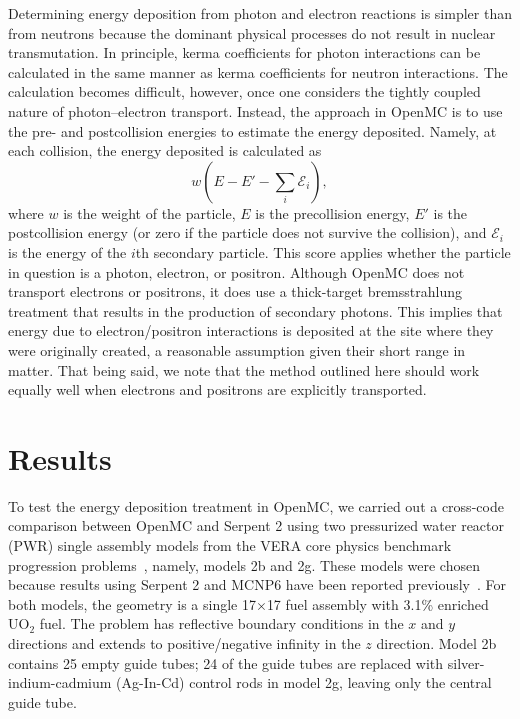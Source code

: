 \documentclass{anstrans}
\begin{document}
Determining energy deposition from photon and electron reactions is simpler than
from neutrons because the dominant physical processes do not result in nuclear
transmutation. In principle, kerma coefficients for photon interactions can be
calculated in the same manner as kerma coefficients for neutron interactions.
The calculation becomes difficult, however, once one considers the tightly
coupled nature of photon--electron transport. Instead, the approach in OpenMC is
to use the pre- and postcollision energies to estimate the energy deposited.
Namely, at each collision, the energy deposited is calculated as
\begin{equation}
    w \left ( E - E' - \sum_i \mathcal{E}_i \right ),
\end{equation}
where $w$ is the weight of the particle, $E$ is the precollision energy, $E'$
is the postcollision energy (or zero if the particle does not survive the
collision), and $\mathcal{E}_i$ is the energy of the $i$th secondary particle.
This score applies whether the particle in question is a photon, electron, or
positron. Although OpenMC does not transport electrons or positrons, it does use
a thick-target bremsstrahlung treatment that results in the production of
secondary photons. This implies that energy due to electron/positron
interactions is deposited at the site where they were originally created, a
reasonable assumption given their short range in matter. That being said, we
note that the method outlined here should work equally well when electrons and
positrons are explicitly transported.

\section{Results}

To test the energy deposition treatment in OpenMC, we carried out a cross-code
comparison between OpenMC and Serpent 2 using two pressurized water reactor
(PWR) single assembly models from the VERA core physics benchmark progression
problems~\cite{godfrey2014casl}, namely, models 2b and 2g. These models were
chosen because results using Serpent 2 and MCNP6 have been reported
previously~\cite{tuominen2019ane}. For both models, the geometry is a single
17$\times$17 fuel assembly with 3.1\% enriched UO$_2$ fuel. The problem has
reflective boundary conditions in the $x$ and $y$ directions and extends to
positive/negative infinity in the $z$ direction. Model 2b contains 25 empty
guide tubes; 24 of the guide tubes are replaced with silver-indium-cadmium
(Ag-In-Cd) control rods in model 2g, leaving only the central guide tube.
\end{document}
